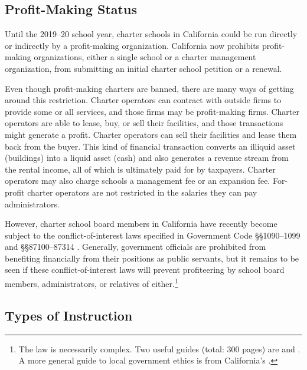 \subsection{Profit-Making Status}\indent

Until the 2019–20 school year, charter schools in California could be run directly or indirectly by a profit-making organization. California now prohibits profit-making organizations, either a single school or a charter management organization, from submitting an initial charter school petition or a renewal.

Even though profit-making charters are banned, there are many ways of getting around this restriction. Charter operators can contract with outside firms to provide some or all services, and those firms may be profit-making firms. Charter operators are able to lease, buy, or sell their facilities, and those transactions might generate a profit. Charter operators can sell their facilities and lease them back from the buyer. This kind of financial transaction converts an illiquid asset (buildings) into a liquid asset (cash) and also generates a revenue stream from the rental income, all of which is ultimately paid for by taxpayers. Charter operators may also charge schools a management fee or an expansion fee. For-profit charter operators are not restricted in the salaries they can pay administrators.

However, charter school board members in California have recently become subject to the conflict-of-interest laws specified in Government Code §§1090–1099 and §§87100–87314 \parencite{Becerra.Medeiros2018}. Generally, government officials are prohibited from benefiting financially from their positions as public servants, but it remains to be seen if these conflict-of-interest laws will prevent profiteering by school board members, administrators, or relatives of either.\footnote{The law is necessarily complex. Two useful guides (total: 300 pages) are \textcite{Chaney.etal2010} and \textcite{Ennis.etal2016}. A more general guide to local government ethics is  from California's \citeauthor{InstituteForLocalGovernment2016} \parencite{InstituteForLocalGovernment2016}.}

\subsection{Types of Instruction}%
\label{sec:types-instruction}\indent%

